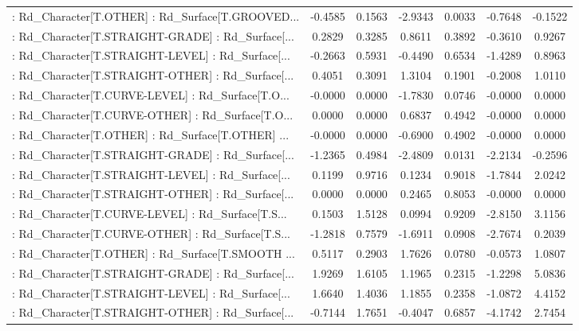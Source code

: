 \begin{longtable}{p{4cm}cccccc}
 : Rd\_Character[T.OTHER] : Rd\_Surface[T.GROOVED... & -0.4585 &    0.1563 & -2.9343 &       0.0033 & -0.7648 & -0.1522 \\
 : Rd\_Character[T.STRAIGHT-GRADE] : Rd\_Surface[... &  0.2829 &    0.3285 &  0.8611 &       0.3892 & -0.3610 &  0.9267 \\
 : Rd\_Character[T.STRAIGHT-LEVEL] : Rd\_Surface[... & -0.2663 &    0.5931 & -0.4490 &       0.6534 & -1.4289 &  0.8963 \\
 : Rd\_Character[T.STRAIGHT-OTHER] : Rd\_Surface[... &  0.4051 &    0.3091 &  1.3104 &       0.1901 & -0.2008 &  1.0110 \\
 : Rd\_Character[T.CURVE-LEVEL] : Rd\_Surface[T.O... & -0.0000 &    0.0000 & -1.7830 &       0.0746 & -0.0000 &  0.0000 \\
 : Rd\_Character[T.CURVE-OTHER] : Rd\_Surface[T.O... &  0.0000 &    0.0000 &  0.6837 &       0.4942 & -0.0000 &  0.0000 \\
 : Rd\_Character[T.OTHER] : Rd\_Surface[T.OTHER] ... & -0.0000 &    0.0000 & -0.6900 &       0.4902 & -0.0000 &  0.0000 \\
 : Rd\_Character[T.STRAIGHT-GRADE] : Rd\_Surface[... & -1.2365 &    0.4984 & -2.4809 &       0.0131 & -2.2134 & -0.2596 \\
 : Rd\_Character[T.STRAIGHT-LEVEL] : Rd\_Surface[... &  0.1199 &    0.9716 &  0.1234 &       0.9018 & -1.7844 &  2.0242 \\
 : Rd\_Character[T.STRAIGHT-OTHER] : Rd\_Surface[... &  0.0000 &    0.0000 &  0.2465 &       0.8053 & -0.0000 &  0.0000 \\
 : Rd\_Character[T.CURVE-LEVEL] : Rd\_Surface[T.S... &  0.1503 &    1.5128 &  0.0994 &       0.9209 & -2.8150 &  3.1156 \\
 : Rd\_Character[T.CURVE-OTHER] : Rd\_Surface[T.S... & -1.2818 &    0.7579 & -1.6911 &       0.0908 & -2.7674 &  0.2039 \\
 : Rd\_Character[T.OTHER] : Rd\_Surface[T.SMOOTH ... &  0.5117 &    0.2903 &  1.7626 &       0.0780 & -0.0573 &  1.0807 \\
 : Rd\_Character[T.STRAIGHT-GRADE] : Rd\_Surface[... &  1.9269 &    1.6105 &  1.1965 &       0.2315 & -1.2298 &  5.0836 \\
 : Rd\_Character[T.STRAIGHT-LEVEL] : Rd\_Surface[... &  1.6640 &    1.4036 &  1.1855 &       0.2358 & -1.0872 &  4.4152 \\
 : Rd\_Character[T.STRAIGHT-OTHER] : Rd\_Surface[... & -0.7144 &    1.7651 & -0.4047 &       0.6857 & -4.1742 &  2.7454 \\

\end{longtable}
